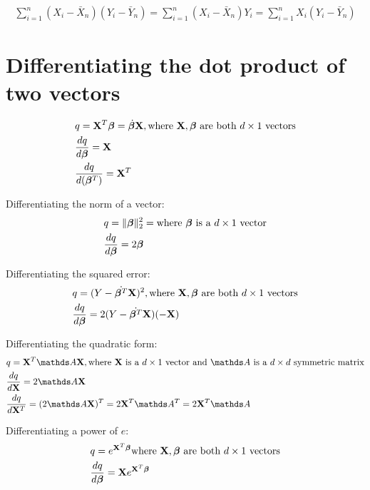 \begin {equation} \begin {split}
\sum \limits_{i=1}^{n}(X_i - \bar X_n)(Y_i - \bar Y_n) = \sum \limits_{i=1}^{n}(X_i - \bar X_n)Y_i = \sum \limits_{i=1}^{n}X_i(Y_i - \bar Y_n)
\end {split} \end {equation}

\section {Differentiating the dot product of two vectors}
\begin {equation} \begin {split}
& q = \mathbf{X}^T \bm{\beta} = \dot {\bm{\beta}} {\mathbf{X}} , \text {where $\mathbf{X}, \bm{\beta}$ are both $d \times 1$ vectors} \\
& \frac {dq} {d \bm{\beta}} = \mathbf{X} \\
& \frac {dq} {d (\bm{\beta}^T)} = \mathbf{X}^T \\
\end {split} \end {equation}

Differentiating the norm of a vector:
\begin {equation} \begin {split}
& q = \|\bm{\beta}\|_2^2 =  \text {where $\bm{\beta}$ is a $d \times 1$ vector} \\
& \frac {dq} {d \bm{\beta}} = 2 \bm{\beta} \\
\end {split} \end {equation}

Differentiating the squared error:
\begin {equation} \begin {split}
& q = (Y - \dot {\bm{\beta}^T} {\mathbf{X}})^2, \text {where $\mathbf{X}, \bm{\beta}$ are both $d \times 1$ vectors} \\
& \frac {dq} {d \bm{\beta}} = 2 (Y - \dot {\bm{\beta}^T} {\mathbf{X}}) (- \mathbf{X}) \\
\end {split} \end {equation}

Differentiating the quadratic form:
\begin {equation} \begin {split}
& q = \vX^T \mA \vX, \text {where $\vX$ is a $d \times 1$ vector and $\mA$ is a $d \times d$ symmetric matrix} \\
& \frac {dq} {d \vX} = 2 \mA \vX \\
& \frac {dq} {d \vX^T} = (2 \mA \vX)^T = 2 \vX^T \mA^T = 2 \vX^T \mA \\
\end {split} \end {equation}

Differentiating a power of $e$:
\begin {equation} \begin {split}
& q = e^{\mathbf{X}^T \bm{\beta}} \text {where $\mathbf{X}, \bm{\beta}$ are both $d \times 1$ vectors} \\
& \frac {dq} {d \bm{\beta}} = \mathbf{X} e^{\mathbf{X}^T \bm{\beta}} \\
\end {split} \end {equation}

